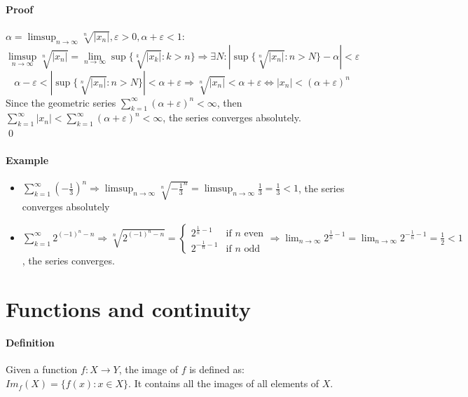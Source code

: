 \documentclass{article}
\newcommand{\DS}{\displaystyle}
\newcommand{\abs}[1]{\left|#1\right|}
\newcommand{\func}[3]{#1 : #2 \rightarrow #3}
\newcommand{\limn}{\lim_{n \to \infty}}
\newcommand{\limsupn}{\limsup_{n \to \infty}}
\newcommand{\series}[1]{\sum_{k=1}^\infty #1}
\newcommand{\Ep}{\varepsilon}
\newcommand{\Def}{\paragraph{Definition}}
\newcommand{\Proof}{\paragraph{Proof}}
\newcommand{\Example}{\paragraph{Example}}
\begin{document}
	\Proof $\alpha = \limsupn \sqrt[n]{\abs{x_n}}, \Ep > 0, \alpha + \Ep
	< 1$:
	\begin{equation*}
		\limsupn \sqrt[n]{\abs{x_n}} = \limn \sup\{\sqrt[k]{\abs{x_k}} : k > n\}
		\Rightarrow \exists N : \abs{\sup\{\sqrt[n]{\abs{x_n}} : n > N\} - \alpha} <
		\Ep
	\end{equation*}
	\begin{equation*}
		\alpha - \Ep < \abs{\sup\{\sqrt[n]{\abs{x_n}} : n > N\}} < \alpha + \Ep
		\Rightarrow \sqrt[n]{\abs{x_n}} < \alpha + \Ep \iff
		\abs{x_n} < (\alpha + \Ep)^n
	\end{equation*}
	Since the geometric series $\DS \series (\alpha + \Ep)^n < \infty$, then
	$\DS \series \abs{x_n} < \series (\alpha + \Ep)^n < \infty$, the series
	converges absolutely.
\\\qed

	\Example
	\begin{itemize}
		\item $\DS \series\left({-\frac{1}{3}}\right)^n \Rightarrow
		\limsupn \sqrt[n]{-\frac{1}{3}^n} = \limsupn \frac{1}{3} = \frac{1}{3} < 1$,
		the series converges absolutely
		\item $\DS \series 2^{(-1)^n-n} \Rightarrow \sqrt[n]{2^{(-1)^n-n}} =
		\begin{cases}
			2^{\frac{1}{n}-1}  & \text{if } n \text{ even} \\
			2^{-\frac{1}{n}-1} & \text{if } n \text{ odd}
		\end{cases} \Rightarrow
		\limn 2^{\frac{1}{n}-1} = \limn 2^{-\frac{1}{n}-1} = \frac{1}{2} < 1$,
		the series converges.
	\end{itemize}

\newpage %
\section{Functions and continuity}

	\Def Given a function $\func{f}{X}{Y}$, the image of $f$ is defined as:
	$Im_f(X) = \{ f(x) : x \in X \}$. It contains all the images of all elements
	of $X$.
\end{document}
